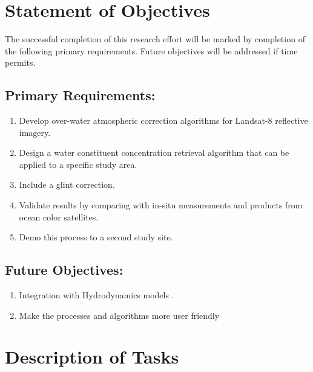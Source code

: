 \section{Statement of Objectives}
\label{sec:objectives}
The successful completion of this research effort will be marked by completion of the following primary requirements. Future objectives will be addressed if time permits.

\subsection{Primary Requirements:}
\begin{enumerate}
	\item Develop over-water atmospheric correction algorithms for Landsat-8 reflective imagery.
	\item Design a water constituent concentration retrieval algorithm that can be applied to a specific study area.
	\item { Include a glint correction.} 
	\item Validate results by comparing with in-situ measurements and products from ocean color satellites.
	\item Demo this process to a second study site.
\end{enumerate}

\subsection{Future Objectives:}
\begin{enumerate}
	\item Integration with Hydrodynamics models  .
	\item Make the processes and algorithms more user friendly 
\end{enumerate}
\section{Description of Tasks}
\label{sec:tasks}

